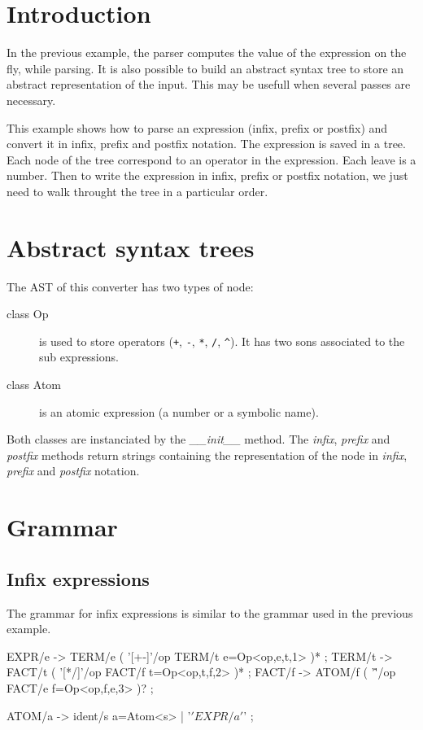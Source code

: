 \section{Introduction}

In the previous example, the parser computes the value of the expression on the fly, while parsing.
It is also possible to build an abstract syntax tree to store an abstract representation of the input.
This may be usefull when several passes are necessary.

This example shows how to parse an expression (infix, prefix or postfix) and convert it in infix, prefix and postfix notation.
The expression is saved in a tree. Each node of the tree correspond to an operator in the expression. Each leave is a number.
Then to write the expression in infix, prefix or postfix notation, we just need to walk throught the tree in a particular order.

\section{Abstract syntax trees}

The AST of this converter has two types of node:

\begin{description}
	\item [class Op] is used to store operators (\verb$+$, \verb$-$, \verb$*$, \verb$/$, \verb$^$).
		It has two sons associated to the sub expressions.
	\item [class Atom] is an atomic expression (a number or a symbolic name).
\end{description}

Both classes are instanciated by the \emph{\_\_init\_\_} method. The \emph{infix}, \emph{prefix} and \emph{postfix} methods return strings containing the representation of the node in \emph{infix}, \emph{prefix} and \emph{postfix} notation.

\section{Grammar}

\subsection{Infix expressions}

The grammar for infix expressions is similar to the grammar used in the previous example.

\begin{verbatimtab}[4]
EXPR/e -> TERM/e ( '[+-]'/op TERM/t e=Op<op,e,t,1> )* ;
TERM/t -> FACT/t ( '[*/]'/op FACT/f t=Op<op,t,f,2> )* ;
FACT/f -> ATOM/f ( '\^'/op FACT/e f=Op<op,f,e,3> )? ;

ATOM/a -> ident/s a=Atom<s> | '\(' EXPR/a '\)' ;
\end{verbatimtab}

